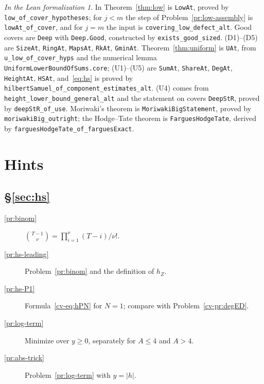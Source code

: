 \documentclass[reqno]{amsart}
\theoremstyle{definition}
\theoremstyle{plain}
\theoremstyle{remark}
\newtheorem*{leanremark}{In the Lean formalization}
\newcommand{\tl}[1]{\texttt{#1}}
\begin{document}
\begin{leanremark}
\raggedright In \cite{Lean} Theorem~\ref{thm:low} is \tl{LowAt}, proved by \tl{low\_\allowbreak{}of\_\allowbreak{}cover\_\allowbreak{}hypotheses}; for \(j < m\) the step of Problem~\ref{pr:low-assembly} is \tl{lowAt\_\allowbreak{}of\_\allowbreak{}cover}, and for \(j = m\) the input is \tl{covering\_\allowbreak{}low\_\allowbreak{}defect\_\allowbreak{}alt}.  Good covers are \tl{Deep} with \tl{Deep.\allowbreak{}Good}, constructed by \tl{exists\_\allowbreak{}good\_\allowbreak{}sized}.  (D1)--(D5) are \tl{SizeAt}, \tl{RingAt}, \tl{MapsAt}, \tl{RkAt}, \tl{GminAt}.  Theorem~\ref{thm:uniform} is \tl{UAt}, from \tl{u\_\allowbreak{}low\_\allowbreak{}of\_\allowbreak{}cover\_\allowbreak{}hyps} and the numerical lemma \tl{UniformLowerBoundOfSums.\allowbreak{}core}; (U1)--(U5) are \tl{SumAt}, \tl{ShareAt}, \tl{DegAt}, \tl{HeightAt}, \tl{HSAt}, and~\eqref{eq:hs} is proved by \tl{hilbertSamuel\_\allowbreak{}of\_\allowbreak{}component\_\allowbreak{}estimates\_\allowbreak{}alt}.  (U4) comes from \tl{height\_\allowbreak{}lower\_\allowbreak{}bound\_\allowbreak{}general\_\allowbreak{}alt} and the statement on covers \tl{DeepStR}, proved by \tl{deepStR\_\allowbreak{}of\_\allowbreak{}use}.  Moriwaki's theorem is \tl{MoriwakiBigStatement}, proved by \tl{moriwakiBig\_\allowbreak{}outright}; the Hodge--Tate theorem is \tl{FarguesHodgeTate}, derived by \tl{farguesHodgeTate\_\allowbreak{}of\_\allowbreak{}farguesExact}.
\end{leanremark}

\section*{Hints}

\subsection*{\S\ref{sec:hs}}
\begin{description}
\item[\ref{pr:binom}] \(\binom{T-1}{\nu} = \prod_{i=1}^\nu(T - i)/\nu!\).
\item[\ref{pr:hs-leading}] Problem~\ref{pr:binom} and the definition of \(h_Z\).
\item[\ref{pr:hs-P1}] Formula~\eqref{cv-eq:hPN} for \(N = 1\); compare with Problem~\ref{cv-pr:degED}.
\item[\ref{pr:log-term}] Minimize over \(y \ge 0\), separately for \(A \le 4\) and \(A > 4\).
\item[\ref{pr:abs-trick}] Problem~\ref{pr:log-term} with \(y = \lvert h\rvert\).
\end{description}
\end{document}
